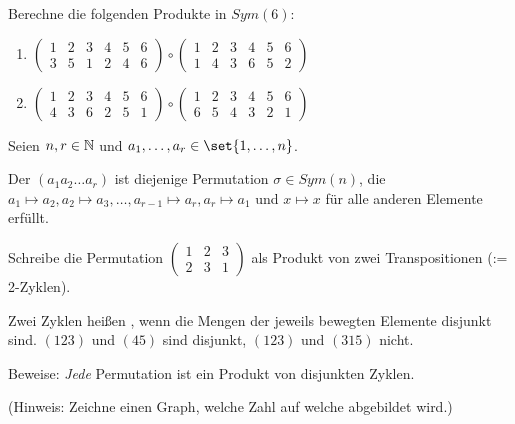 \begin{sheet}
\begin{problem}
Berechne die folgenden Produkte in $Sym(6)$:
\begin{enumerate}
\item $\begin{pmatrix} 1 & 2 & 3 & 4 & 5 & 6 \\ 3 & 5 & 1 & 2 & 4 & 6\end{pmatrix} \circ \begin{pmatrix} 1 & 2 & 3 & 4 & 5 & 6 \\ 1 & 4 & 3 & 6 & 5 & 2\end{pmatrix}$
\item $\begin{pmatrix} 1 & 2 & 3 & 4 & 5 & 6 \\ 4 & 3 & 6 & 2 & 5 & 1\end{pmatrix} \circ \begin{pmatrix} 1 & 2 & 3 & 4 & 5 & 6 \\ 6 & 5 & 4 & 3 & 2 & 1\end{pmatrix}$
\end{enumerate}
\end{problem}

\begin{problem}[title={Zyklenzerlegung}]
Seien $n,r\in\mathbb{N}$ und $a_1,\ldots,a_r\in\set{1,\ldots,n}$.

Der  $(a_1 a_2 \ldots a_r)$ ist diejenige Permutation $\sigma\in Sym(n)$, die $a_1\mapsto a_2, a_2\mapsto a_3, \ldots, a_{r-1}\mapsto a_r, a_r\mapsto a_1$ und $x\mapsto x$ für alle anderen Elemente erfüllt.

\begin{subproblem}[difficulty={leicht}]
Schreibe die Permutation $\begin{pmatrix} 1 & 2 & 3 \\ 2 & 3 & 1 \end{pmatrix}$ als Produkt von zwei Transpositionen (:= 2-Zyklen).
\end{subproblem}

Zwei Zyklen heißen , wenn die Mengen der jeweils bewegten Elemente disjunkt sind. $(123)$ und $(45)$ sind disjunkt, $(123)$ und $(315)$ nicht.
\begin{subproblem}[difficulty={leicht bis mittel}]
Beweise: \emph{Jede} Permutation ist ein Produkt von disjunkten Zyklen.

(Hinweis: Zeichne einen Graph, welche Zahl auf welche abgebildet wird.)
\end{subproblem}


\end{problem}
\end{sheet}
